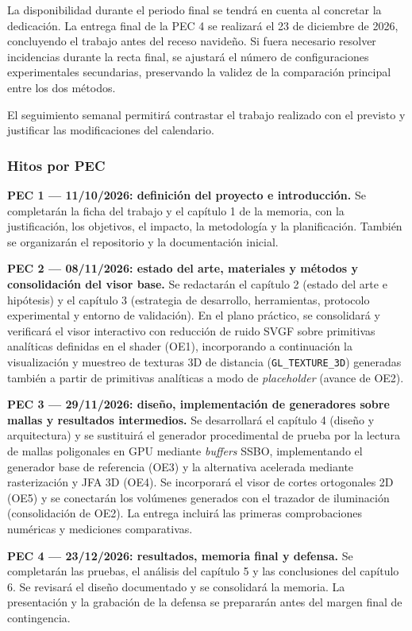 La disponibilidad durante el periodo final se tendrá en cuenta al concretar la dedicación. La entrega final de la PEC 4 se realizará el 23 de diciembre de 2026, concluyendo el trabajo antes del receso navideño. Si fuera necesario resolver incidencias durante la recta final, se ajustará el número de configuraciones experimentales secundarias, preservando la validez de la comparación principal entre los dos métodos.

El seguimiento semanal permitirá contrastar el trabajo realizado con el previsto y justificar las modificaciones del calendario.

\subsubsection{Hitos por PEC}

\textbf{PEC 1 --- 11/10/2026: definición del proyecto e introducción.} Se completarán la ficha del trabajo y el capítulo 1 de la memoria, con la justificación, los objetivos, el impacto, la metodología y la planificación. También se organizarán el repositorio y la documentación inicial.

\textbf{PEC 2 --- 08/11/2026: estado del arte, materiales y métodos y consolidación del visor base.} Se redactarán el capítulo 2 (estado del arte e hipótesis) y el capítulo 3 (estrategia de desarrollo, herramientas, protocolo experimental y entorno de validación). En el plano práctico, se consolidará y verificará el visor interactivo con reducción de ruido SVGF sobre primitivas analíticas definidas en el shader (OE1), incorporando a continuación la visualización y muestreo de texturas 3D de distancia (\texttt{GL\_TEXTURE\_3D}) generadas también a partir de primitivas analíticas a modo de \textit{placeholder} (avance de OE2).

\textbf{PEC 3 --- 29/11/2026: diseño, implementación de generadores sobre mallas y resultados intermedios.} Se desarrollará el capítulo 4 (diseño y arquitectura) y se sustituirá el generador procedimental de prueba por la lectura de mallas poligonales en GPU mediante \textit{buffers} SSBO, implementando el generador base de referencia (OE3) y la alternativa acelerada mediante rasterización y JFA 3D (OE4). Se incorporará el visor de cortes ortogonales 2D (OE5) y se conectarán los volúmenes generados con el trazador de iluminación (consolidación de OE2). La entrega incluirá las primeras comprobaciones numéricas y mediciones comparativas.

\textbf{PEC 4 --- 23/12/2026: resultados, memoria final y defensa.} Se completarán las pruebas, el análisis del capítulo 5 y las conclusiones del capítulo 6. Se revisará el diseño documentado y se consolidará la memoria. La presentación y la grabación de la defensa se prepararán antes del margen final de contingencia.

